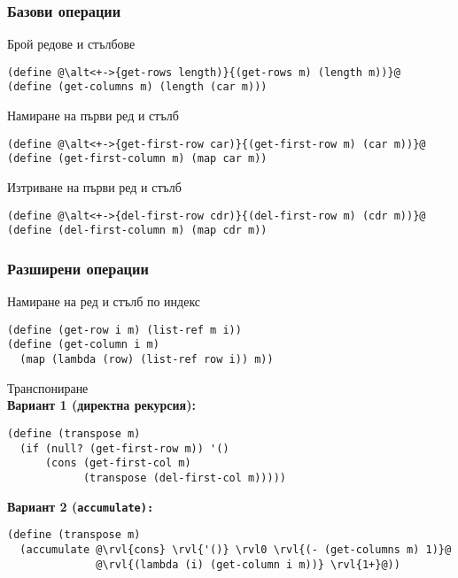 \documentclass[alsotrans]{beamerswitch}
\begin{document}
\begin{frame}[fragile]
  \frametitle{Базови операции}

  Брой редове и стълбове
  \pause
  \onslide<+->
\begin{lstlisting}
(define @\alt<+->{get-rows length)}{(get-rows m) (length m))}@
(define (get-columns m) (length (car m)))
\end{lstlisting}
  \onslide<+->
  Намиране на първи ред и стълб
  \onslide<+->
\begin{lstlisting}
(define @\alt<+->{get-first-row car)}{(get-first-row m) (car m))}@
(define (get-first-column m) (map car m))
\end{lstlisting}
  \onslide<+->
  Изтриване на първи ред и стълб
  \onslide<+->
\begin{lstlisting}
(define @\alt<+->{del-first-row cdr)}{(del-first-row m) (cdr m))}@
(define (del-first-column m) (map cdr m))
\end{lstlisting}
\end{frame}

\begin{frame}[fragile]
  \frametitle{Разширени операции}

  Намиране на ред и стълб по индекс
  \pause
\begin{lstlisting}
(define (get-row i m) (list-ref m i))
(define (get-column i m)
  (map (lambda (row) (list-ref row i)) m))
\end{lstlisting}
  \pause
  Транспониране\\
  \pause
  \onslide<+->
  \textbf{Вариант 1 (директна рекурсия):}
\begin{lstlisting}
(define (transpose m)
  (if (null? (get-first-row m)) '()
      (cons (get-first-col m)
            (transpose (del-first-col m)))))
\end{lstlisting}
  \onslide<+->

 \textbf{Вариант 2 (\tt{accumulate}):}
  \begin{overprint}
\begin{lstlisting}
(define (transpose m)
  (accumulate @\rvl{cons} \rvl{'()} \rvl0 \rvl{(- (get-columns m) 1)}@
              @\rvl{(lambda (i) (get-column i m))} \rvl{1+}@))
\end{lstlisting}
  \end{overprint}
\end{frame}
\end{document}
